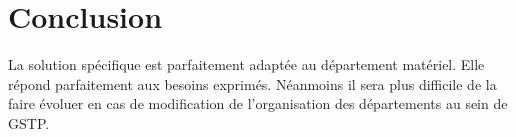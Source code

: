 \section{Conclusion}

La solution spécifique est parfaitement adaptée au département matériel.
Elle répond parfaitement aux besoins exprimés. Néanmoins il sera plus difficile de la
faire évoluer en cas de modification de l'organisation des départements au sein de
GSTP.
